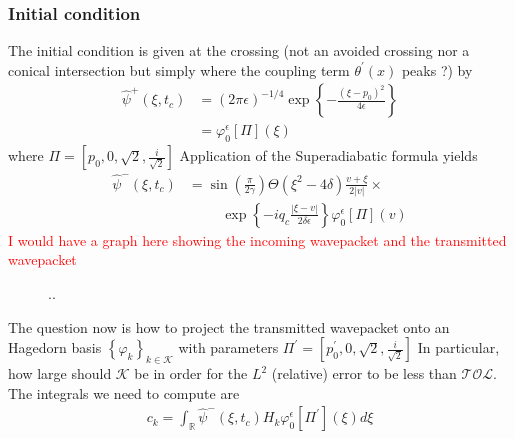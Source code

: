 \documentclass[12pt]{article}
\numberwithin{equation}{section}
\begin{document}
  \subsubsection{Initial condition}
  The initial condition is given at the crossing (not an avoided crossing nor a conical 
  intersection but simply where the coupling term $\theta^\prime(x)$ peaks ?)
  by 
  \begin{equation}
    \begin{split}
      \hat{\psi}^+(\xi, t_c) 
      &= 
      (2 \pi \epsilon)^{-1/4}
      \exp\left\{
        - \frac{(\xi - p_0)^2 }{ 4 \epsilon}
      \right\}
      \\
      &=
      \varphi^{\epsilon}_{0}\left[\Pi\right](\xi)
    \end{split}
  \end{equation}
  where $\Pi = \left[p_0, 0, \sqrt{2}, \frac{i}{\sqrt{2}}\right]$
  Application of the Superadiabatic formula yields 
  \begin{equation}
    \begin{split}
      \hat{\psi}^{-}(\xi,t_c)
      &=
      \sin\left(\frac{\pi}{2 \gamma}\right)
      \Theta(\xi^2 - 4\delta)
      \frac{v + \xi}{2|v|} \times
      \\
      &
      \hspace{1cm}
      \exp\left\{-i q_c \frac{|\xi - v|}{2\delta \epsilon } \right\} 
      \varphi^{\epsilon}_{0}\left[\Pi\right](v)
    \end{split}
  \end{equation}
  \textcolor{red}{I would have a graph here showing the incoming wavepacket and the 
  transmitted wavepacket}
  \begin{figure}[h!]
    \centering
    \scalebox{0.8}{
    
    }
    \caption{..}
    \label{figure}
  \end{figure}
  The question now is how to project the transmitted wavepacket onto an Hagedorn basis
  $\left\{\varphi_k\right\}_{k \in \mathcal{K}}$
  with parameters $\Pi^\prime = \left[p_0^\prime, 0, \sqrt{2}, \frac{i}{\sqrt{2}}\right]$
  In particular, how large should $\mathcal{K}$ be in order for the $L^2$ (relative) error 
  to be less than $\mathcal{TOL}$. The integrals we need to compute are 
  \begin{equation}
    \begin{split}
      c_k 
      = 
      \int_{\mathbb{R}}
      \hat{\psi}^{-}(\xi, t_c) 
      H_k 
      \varphi_0^\epsilon [\Pi^\prime] (\xi)
      d\xi 
    \end{split}
  \end{equation}
\end{document}
